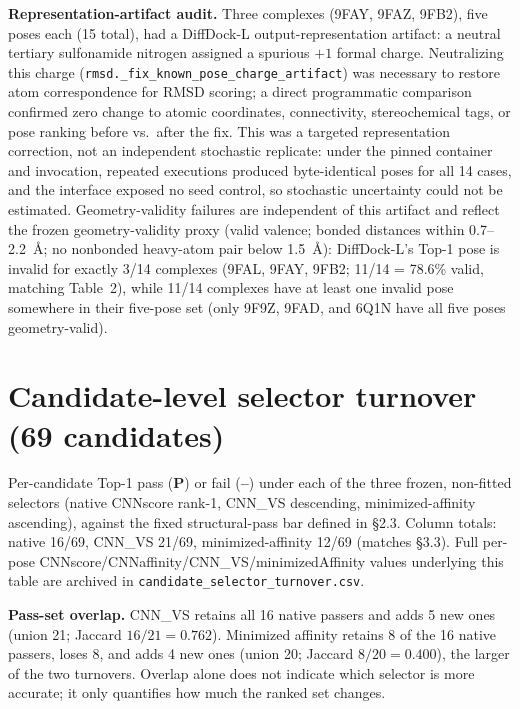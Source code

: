 \documentclass{article}
\begin{document}
\textbf{Representation-artifact audit.} Three complexes (9FAY, 9FAZ, 9FB2), five poses each (15 total), had a DiffDock-L output-representation artifact: a neutral tertiary sulfonamide nitrogen assigned a spurious $+1$ formal charge. Neutralizing this charge (\texttt{rmsd.\_fix\_known\_pose\_charge\_artifact}) was necessary to restore atom correspondence for RMSD scoring; a direct programmatic comparison confirmed zero change to atomic coordinates, connectivity, stereochemical tags, or pose ranking before vs.\ after the fix. This was a targeted representation correction, not an independent stochastic replicate: under the pinned container and invocation, repeated executions produced byte-identical poses for all 14 cases, and the interface exposed no seed control, so stochastic uncertainty could not be estimated. Geometry-validity failures are independent of this artifact and reflect the frozen geometry-validity proxy (valid valence; bonded distances within 0.7--2.2~\AA; no nonbonded heavy-atom pair below 1.5~\AA): DiffDock-L's Top-1 pose is invalid for exactly 3/14 complexes (9FAL, 9FAY, 9FB2; 11/14 = 78.6\% valid, matching Table~2), while 11/14 complexes have at least one invalid pose somewhere in their five-pose set (only 9F9Z, 9FAD, and 6Q1N have all five poses geometry-valid).

\FloatBarrier
\section{Candidate-level selector turnover (69 candidates)}
\label{app:e}

Per-candidate Top-1 pass (\textbf{P}) or fail (\textbf{--}) under each of the three frozen, non-fitted selectors (native CNNscore rank-1, CNN\_VS descending, minimized-affinity ascending), against the fixed structural-pass bar defined in \S2.3. Column totals: native 16/69, CNN\_VS 21/69, minimized-affinity 12/69 (matches \S3.3). Full per-pose CNNscore/CNNaffinity/CNN\_VS/minimizedAffinity values underlying this table are archived in \texttt{candidate\_selector\_turnover.csv}.

\textbf{Pass-set overlap.} CNN\_VS retains all 16 native passers and adds 5 new ones (union 21; Jaccard $16/21=0.762$). Minimized affinity retains 8 of the 16 native passers, loses 8, and adds 4 new ones (union 20; Jaccard $8/20=0.400$), the larger of the two turnovers. Overlap alone does not indicate which selector is more accurate; it only quantifies how much the ranked set changes.
\end{document}
